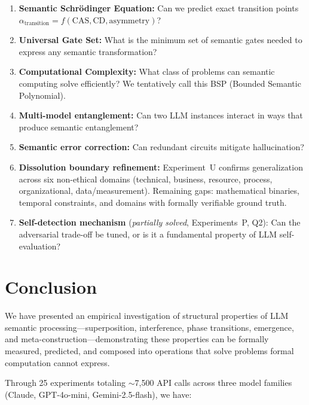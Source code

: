 \documentclass[11pt,a4paper]{article}
\newcommand{\CAS}{\mathrm{CAS}}
\newcommand{\CD}{\mathrm{CD}}
\begin{document}
\begin{enumerate}
\item \textbf{Semantic Schr\"{o}dinger Equation:} Can we predict exact transition points $\alpha_{\text{transition}} = f(\CAS, \CD, \text{asymmetry})$?

\item \textbf{Universal Gate Set:} What is the minimum set of semantic gates needed to express any semantic transformation?

\item \textbf{Computational Complexity:} What class of problems can semantic computing solve efficiently? We tentatively call this BSP (Bounded Semantic Polynomial).

\item \textbf{Multi-model entanglement:} Can two LLM instances interact in ways that produce semantic entanglement?

\item \textbf{Semantic error correction:} Can redundant circuits mitigate hallucination?

\item \textbf{Dissolution boundary refinement:} Experiment~U confirms generalization across six non-ethical domains (technical, business, resource, process, organizational, data/measurement). Remaining gaps: mathematical binaries, temporal constraints, and domains with formally verifiable ground truth.

\item \textbf{Self-detection mechanism} (\emph{partially solved}, Experiments~P, Q2): Can the adversarial trade-off be tuned, or is it a fundamental property of LLM self-evaluation?
\end{enumerate}

\section{Conclusion}

We have presented an empirical investigation of structural properties of LLM semantic processing---superposition, interference, phase transitions, emergence, and meta-construction---demonstrating these properties can be formally measured, predicted, and composed into operations that solve problems formal computation cannot express.

Through 25 experiments totaling $\sim$7,500 API calls across three model families (Claude, GPT-4o-mini, Gemini-2.5-flash), we have:
\end{document}
